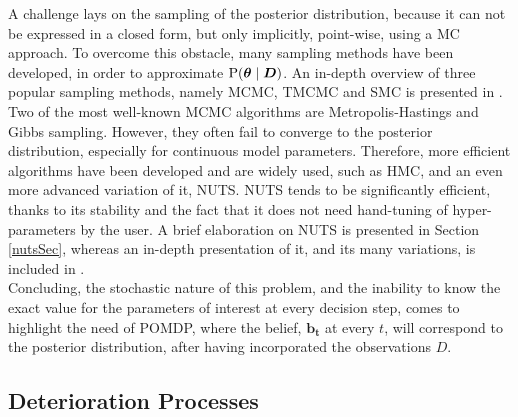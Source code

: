 A challenge lays on the sampling of the posterior distribution, because it can not be expressed in a closed form, but only implicitly, point-wise, using a \gls{MC} approach. To overcome this obstacle, many sampling methods have been developed, in order to approximate $\text{P}(\boldsymbol{\theta} \mid \boldsymbol{D})$. An in-depth overview of three popular sampling methods, namely \gls{MCMC}, \gls{TMCMC} and \gls{SMC} is presented in \cite{lye2021sampling}. Two of the most well-known \gls{MCMC} algorithms are Metropolis-Hastings and Gibbs sampling. However, they often fail to converge to the posterior distribution, especially for continuous model parameters. Therefore, more efficient algorithms have been developed and are widely used, such as \gls{HMC}, and an even more advanced variation of it, \acrfull{NUTS}. \gls{NUTS} tends to be significantly efficient, thanks to its stability and the fact that it does not need hand-tuning of hyper-parameters by the user. A brief elaboration on \gls{NUTS} is presented in Section \ref{nutsSec}, whereas an in-depth presentation of it, and its many variations, is included in \cite{hoffman2014no}. \\

Concluding, the stochastic nature of this problem, and the inability to know the exact value for the parameters of interest at every decision step, comes to highlight the need of \gls{POMDP}, where the belief, $\boldsymbol{b_t}$ at every $t$, will correspond to the posterior distribution, after having incorporated the observations $D$.\\



\subsection{Deterioration Processes} \label{detProcsSec}

